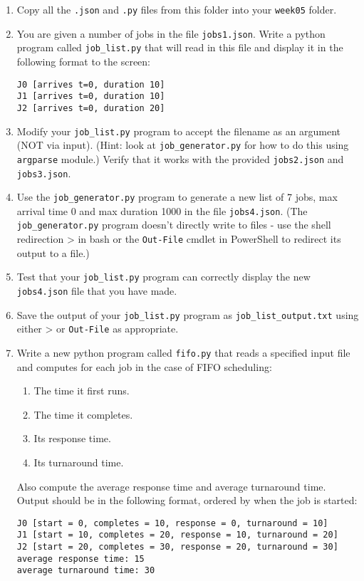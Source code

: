 \begin{enumerate}

\item
  Copy all the \texttt{.json} and \texttt{.py} files from this folder into your \texttt{week05} folder. 

\item 
  You are given a number of jobs in the file \texttt{jobs1.json}.
  Write a python program called \texttt{job\_list.py} that will read in this file and display it in the following format to the screen:
\begin{verbatim}
J0 [arrives t=0, duration 10]
J1 [arrives t=0, duration 10]
J2 [arrives t=0, duration 20]
\end{verbatim}
  
\item
  Modify your \texttt{job\_list.py} program to accept the filename as an argument (NOT via input).
  (Hint: look at \texttt{job\_generator.py} for how to do this using \texttt{argparse} module.)
  Verify that it works with the provided \texttt{jobs2.json} and \texttt{jobs3.json}.

\item
  Use the \texttt{job\_generator.py} program to generate a new list of 7 jobs, max arrival time 0 and max duration 1000 in the file \texttt{jobs4.json}.
  (The \texttt{job\_generator.py} program doesn't directly write to files - use the shell redirection > in bash or the \texttt{Out-File} cmdlet in PowerShell to redirect its output to a file.)

\item
  Test that your \texttt{job\_list.py} program can correctly display the new \texttt{jobs4.json} file that you have made.

\item
  Save the output of your \texttt{job\_list.py} program as \texttt{job\_list\_output.txt} using either > or \texttt{Out-File} as appropriate.

\item \label{step:scheduling-lab:fifo}
  Write a new python program called \texttt{fifo.py} that reads a specified input file and computes for each job in the case of FIFO scheduling:
  \begin{enumerate}
  \item The time it first runs.
  \item The time it completes.
  \item Its response time.
  \item Its turnaround time.
  \end{enumerate}
  Also compute the average response time and average turnaround time. 
  Output should be in the following format, ordered by when the job is started:
\begin{verbatim}
J0 [start = 0, completes = 10, response = 0, turnaround = 10]
J1 [start = 10, completes = 20, response = 10, turnaround = 20]
J2 [start = 20, completes = 30, response = 20, turnaround = 30]
average response time: 15
average turnaround time: 30
\end{verbatim}


\end{enumerate}
